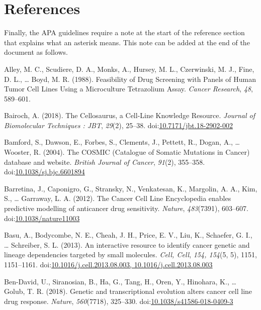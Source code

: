 \documentclass[man]{apa6}
\begin{document}
\section{References}\label{references}

\begingroup
\setlength{\parindent}{-0.5in} \setlength{\leftskip}{0.5in}

Finally, the APA guidelines require a note at the start of the reference
section that explains what an asterisk means. This note can be added at
the end of the document as follows.

\hypertarget{refs}{}
\hypertarget{ref-alley1988}{}
Alley, M. C., Scudiere, D. A., Monks, A., Hursey, M. L., Czerwinski, M.
J., Fine, D. L., \ldots{} Boyd, M. R. (1988). Feasibility of Drug
Screening with Panels of Human Tumor Cell Lines Using a Microculture
Tetrazolium Assay. \emph{Cancer Research}, \emph{48}, 589--601.

\hypertarget{ref-bairoch2018}{}
Bairoch, A. (2018). The Cellosaurus, a Cell-Line Knowledge Resource.
\emph{Journal of Biomolecular Techniques : JBT}, \emph{29}(2), 25--38.
doi:\href{https://doi.org/10.7171/jbt.18-2902-002}{10.7171/jbt.18-2902-002}

\hypertarget{ref-bamford2004}{}
Bamford, S., Dawson, E., Forbes, S., Clements, J., Pettett, R., Dogan,
A., \ldots{} Wooster, R. (2004). The COSMIC (Catalogue of Somatic
Mutations in Cancer) database and website. \emph{British Journal of
Cancer}, \emph{91}(2), 355--358.
doi:\href{https://doi.org/10.1038/sj.bjc.6601894}{10.1038/sj.bjc.6601894}

\hypertarget{ref-barretina2012}{}
Barretina, J., Caponigro, G., Stransky, N., Venkatesan, K., Margolin, A.
A., Kim, S., \ldots{} Garraway, L. A. (2012). The Cancer Cell Line
Encyclopedia enables predictive modelling of anticancer drug
sensitivity. \emph{Nature}, \emph{483}(7391), 603--607.
doi:\href{https://doi.org/10.1038/nature11003}{10.1038/nature11003}

\hypertarget{ref-basu2013}{}
Basu, A., Bodycombe, N. E., Cheah, J. H., Price, E. V., Liu, K.,
Schaefer, G. I., \ldots{} Schreiber, S. L. (2013). An interactive
resource to identify cancer genetic and lineage dependencies targeted by
small molecules. \emph{Cell, Cell}, \emph{154, 154}(5, 5), 1151,
1151--1161.
doi:\href{https://doi.org/10.1016/j.cell.2013.08.003,\%2010.1016/j.cell.2013.08.003}{10.1016/j.cell.2013.08.003, 10.1016/j.cell.2013.08.003}

\hypertarget{ref-ben-david2018}{}
Ben-David, U., Siranosian, B., Ha, G., Tang, H., Oren, Y., Hinohara, K.,
\ldots{} Golub, T. R. (2018). Genetic and transcriptional evolution
alters cancer cell line drug response. \emph{Nature}, \emph{560}(7718),
325--330.
doi:\href{https://doi.org/10.1038/s41586-018-0409-3}{10.1038/s41586-018-0409-3}
\end{document}
